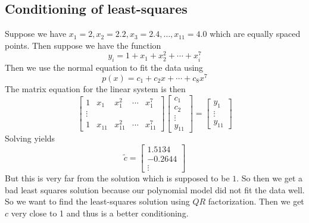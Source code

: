 \documentclass[11pt]{article}
\begin{document}
\subsection{Conditioning of least-squares}
Suppose we have $x_1= 2, x_2=2.2,x_3=2.4, \dots, x_{11} = 4.0$ which are equally spaced points.
Then suppose we have the function
\[
    y_i = 1 + x_1 + x_2^2 + \cdots + x_i^7
\]
Then we use the normal equation to fit the data using
\[
    p(x) = c_1 + c_2x + \cdots + c_8x^7
\]
The matrix equation for the linear system is then
\[
\begin{bmatrix}
    1 &x_1&x_1^2&\cdots&x_1^7 \\
    \vdots\\
    1 & x_{11} & x_{11}^2 & \cdots & x_{11}^7
\end{bmatrix}
\begin{bmatrix}
    c_1\\c_2\\\vdots\\y_{11}
\end{bmatrix}
= 
\begin{bmatrix}
    y_1\\\vdots\\y_{11}
\end{bmatrix}
\]
Solving yields
\[
  \tilde{c} = \begin{bmatrix}
    1.5134\\-0.2644\\\vdots
  \end{bmatrix}  
\]
But this is very far from the solution which is supposed to be $1$. So then we get a bad least squares solution because our polynomial model did not fit the data well.
So we want to find the least-squares solution using $QR$ factorization. Then we get $c$ very close to 1 and thus is a better conditioning.
\end{document}
